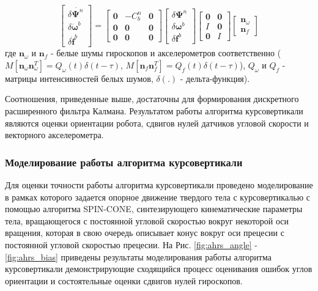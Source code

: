 \documentclass[14pt]{article}
\begin{document}
\begin{equation}\label{equ:ahrs_errors_matrix}
\begin{bmatrix}
\delta\dot{\boldsymbol\Psi^n} \\ \delta \dot {\boldsymbol\omega}^b \\ \delta  \dot {\boldsymbol f}^b
\end{bmatrix}
 = 
\begin{bmatrix}
 \boldsymbol 0 & -C_b^n & \boldsymbol 0  \\
 \boldsymbol 0 & \boldsymbol 0 &\boldsymbol  0  \\
 \boldsymbol  0 & \boldsymbol 0 & \boldsymbol 0  
\end{bmatrix}
\begin{bmatrix}
\delta \boldsymbol\Psi^n \\ \delta \boldsymbol{\omega}^b \\ \delta  \boldsymbol{ f}^b
\end{bmatrix}
\begin{bmatrix}
\boldsymbol 0 & \boldsymbol 0 \\
I & \boldsymbol 0 \\
\boldsymbol 0 & I
\end{bmatrix}
\begin{bmatrix}
\boldsymbol n_{\omega} \\
\boldsymbol n_{f}
\end{bmatrix}
\end{equation}
где  $\boldsymbol n_\omega$  и $\boldsymbol n_f$ - белые шумы  гироскопов и акселерометров соответственно ($M\left[ \boldsymbol n_\omega \boldsymbol n_\omega^T\right] = Q_\omega\left(t\right)\delta\left(t-\tau\right)$, $M\left[ \boldsymbol n_f \boldsymbol n_f^T\right] = Q_f\left(t\right)\delta\left(t-\tau\right)$), $Q_\omega$ и $Q_f$ - матрицы интенсивностей белых шумов, $\delta\left(.\right)$ - дельта-функция).

Соотношения, приведенные выше, достаточны для формирования дискретного расширенного фильтра Калмана.
Результатом работы алгоритма курсовертикали являются оценки ориентации робота, сдвигов нулей датчиков угловой скорости и векторного акселерометра. 

\subsubsection{Моделирование работы алгоритма курсовертикали}
Для оценки точности работы алгоритма курсовертикали проведено моделирование в рамках которого задается опорное движение твердого тела с курсовертикалью с помощью алгоритма SPIN-CONE, синтезирующего кинематические параметры тела, вращающегося с постоянной угловой скоростью вокруг некоторой оси вращения, которая в свою очередь описывает конус вокруг оси прецесии с постоянной угловой скоростью прецесии. 
На Рис. \ref{fig:ahrs_angle} - \ref{fig:ahrs_bias} приведены результаты моделирования работы алгоритма курсовертикали демонстрирующие сходящийся процесс оценивания ошибок углов ориентации и состоятельные оценки сдвигов нулей гироскопов. 
\end{document}
